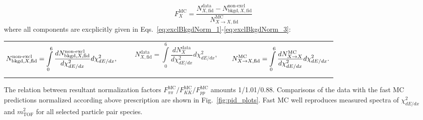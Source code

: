 \begin{equation}\label{eq:exclBkgdNorm}
 F_{X}^{\text{MC}} = \frac{ N_{X,\text{fid}}^{\text{data}} - N_{\text{bkgd},X,\text{fid}}^{\text{non-excl}} }{ N_{X\rightarrow X, \text{fid}}^{\text{MC}} }
\end{equation}%
%
where all components are excplicitly given in Eqs.~\eqref{eq:exclBkgdNorm_1}-\eqref{eq:exclBkgdNorm_3}:\newline
%
\begin{tabulary}{\textwidth}{LCR}
\begin{equation}\label{eq:exclBkgdNorm_1}\hspace*{-2pt}
	 N_{\text{bkgd},X,\text{fid}}^{\text{non-excl}} = \int\limits_{0}^{6}\frac{dN_{\text{bkgd},X,\text{fid}}^{\text{non-excl}}}{d\chi^{2}_{dE/dx}}d\chi^{2}_{dE/dx},
\end{equation}&
\begin{equation}\label{eq:exclBkgdNorm_2}~~~~~~~
	N_{X,\text{fid}}^{\text{data}} = \int\limits_{0}^{6}\frac{dN_{X}^{\text{data}}}{d\chi^{2}_{dE/dx}}d\chi^{2}_{dE/dx},
\end{equation}&
\begin{equation}\label{eq:exclBkgdNorm_3}\hspace*{10pt}
	N_{X\rightarrow X, \text{fid}}^{\text{MC}} = \int\limits_{0}^{6}\frac{dN_{X\rightarrow X}^{\text{MC}}}{d\chi^{2}_{dE/dx}}d\chi^{2}_{dE/dx}.
\end{equation}
\end{tabulary}%

The relation between resultant normalization factors $F_{\pi\pi}^{\text{MC}}/F_{KK}^{\text{MC}}/F_{pp}^{\text{MC}}$ amounts 1/1.01/0.88. Comparisons of the data with the fast MC predictions normalized according above prescription are shown in Fig.~\ref{fig:pid_plots}. Fast MC well reproduces measured spectra of $\chi^{2}_{dE/dx}$ and $m^{2}_{\text{TOF}}$ for all selected particle pair species.


